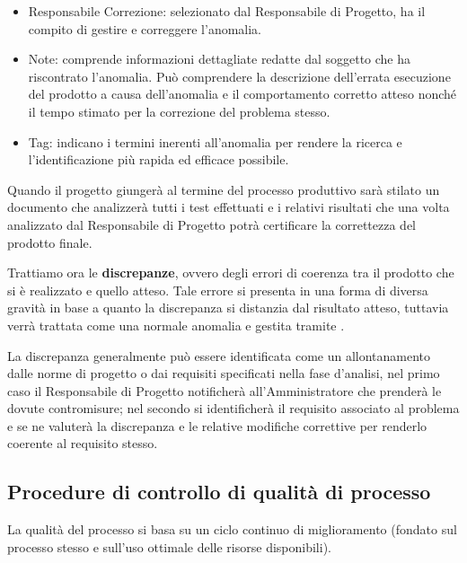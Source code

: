 \begin{itemize}
\item Responsabile Correzione: selezionato dal Responsabile di Progetto, ha il compito di gestire e correggere l'anomalia.
\item Note: comprende informazioni dettagliate redatte dal soggetto che ha riscontrato l'anomalia. Può comprendere la descrizione dell'errata esecuzione del prodotto a causa dell'anomalia e il comportamento corretto atteso nonché il tempo stimato per la correzione del problema stesso. 
\item Tag: indicano i termini inerenti all'anomalia per rendere la ricerca e l'identificazione più rapida ed efficace possibile.
\end{itemize}

Quando il progetto \caName{} giungerà al termine del processo produttivo sarà stilato un documento che analizzerà tutti i test effettuati e i relativi risultati che una volta analizzato dal Responsabile di Progetto potrà certificare la correttezza del prodotto finale.

Trattiamo ora le \textbf{discrepanze}, ovvero degli errori di coerenza tra il prodotto che si è realizzato e quello atteso. Tale errore si presenta in una forma di diversa gravità in base a quanto la discrepanza si distanzia dal risultato atteso, tuttavia verrà trattata come una normale anomalia e gestita tramite .

La discrepanza generalmente può essere identificata come un allontanamento dalle norme di progetto o dai requisiti specificati nella fase d'analisi, nel primo caso il Responsabile di Progetto notificherà all'Amministratore che prenderà le dovute contromisure; nel secondo si identificherà il requisito associato al problema e se ne valuterà la discrepanza e le relative modifiche correttive per renderlo coerente al requisito stesso.

\subsection{Procedure di controllo di qualità di processo}
La qualità del processo si basa su un ciclo continuo di miglioramento (fondato sul processo stesso e sull'uso ottimale delle risorse disponibili). 

